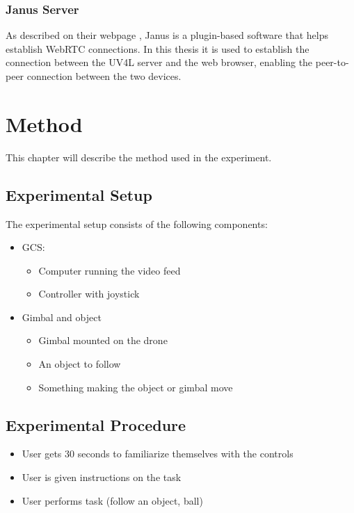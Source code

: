 \documentclass[nofilelist]{cslthse-msc}
\begin{document}
\subsection{Janus Server}
As described on their webpage \cite{janus}, Janus is a plugin-based software that helps establish WebRTC connections. In this thesis it is used to establish the connection between the UV4L server and the web browser, enabling the peer-to-peer connection between the two devices.

\chapter{Method}
This chapter will describe the method used in the experiment.

\section{Experimental Setup}
The experimental setup consists of the following components:
\begin{itemize}
   \item GCS: 
   \begin{itemize}
      \item Computer running the video feed
      \item Controller with joystick 
   \end{itemize}
   
   \item Gimbal and object
   \begin{itemize}
      \item Gimbal mounted on the drone
      \item An object to follow
      \item Something making the object or gimbal move
   \end{itemize}
\end{itemize}

\section{Experimental Procedure}
\begin{itemize}
   \item User gets 30 seconds to familiarize themselves with the controls
   \item User is given instructions on the task
   \item User performs task (follow an object, ball)
\end{itemize}
\end{document}

